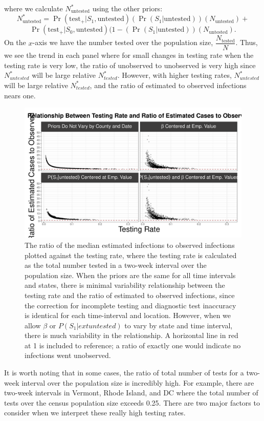 \documentclass[12pt,twoside]{smiththesis}
\begin{document}
where we calculate \(N^*_{\text{untested}}\) using the other priors:
\[N^*_{\text{untested}} =\Pr(\text{test}_+|S_1,\text{untested}) (\Pr(S_1 | \text{untested})) ( N_{\text{untested}} ) + \]
\[\Pr(\text{test}_+|S_0,\text{untested}) (1-(\Pr(S_1 | \text{untested})) ( N_{\text{untested}} ).\]
On the \(x\)-axis we have the number tested over the population size, \(\dfrac{N_{\text{tested}}}{N}\). Thus, we see the trend in each panel where for small changes in testing rate when the testing rate is very low, the ratio of unobserved to unobserved is very high since \(N^*_{untested}\) will be large relative \(N^*_{tested}\). However, with higher testing rates, \(N^*_{untested}\) will be large relative \(N^*_{tested}\), and the ratio of estimated to observed infections nears one.
\begin{figure}
\includegraphics[width=1\linewidth]{figure/testing_rate_ratio} \caption{\label{fig:testrate}The ratio of the median estimated infections to observed infections plotted against the testing rate, where the testing rate is calculated as the total number tested in a two-week interval over the population size. When the priors are the same for all time intervals and states, there is minimal variability relationship between the testing rate and the ratio of estimated to observed infections, since the correction for incomplete testing and diagnostic test inaccuracy is identical for each time-interval and location. However, when we allow $\beta$ or $P(S_1| ext{untested})$ to vary by state and time interval, there is much variability in the relationship. A horizontal line in red at 1 is included to reference; a ratio of exactly one would indicate no infections went unobserved.}\label{fig:unnamed-chunk-9}
\end{figure}
It is worth noting that in some cases, the ratio of total number of tests for a two-week interval over the population size is incredibly high. For example, there are two-week intervals in Vermont, Rhode Island, and DC where the total number of tests over the census population size exceeds 0.25. There are two major factors to consider when we interpret these really high testing rates.
\end{document}
